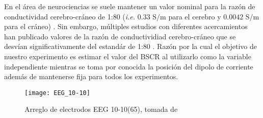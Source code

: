 En el área de neurociencias se suele mantener un valor nominal para la razón de conductividad cerebro-cráneo de 1:80 (\emph{i.e.} $0.33\text{ S/m}$ para el cerebro y $0.0042 \text{ S/m}$ para el cráneo) \cite{Rush1968,Rush1969,Cohen1983}. Sin embargo, múltiples estudios con diferentes acercamientos han publicado valores de la razón de conductividiad cerebro-cráneo que se desvían significativamente del estandár de 1:80 \cite{McCann2019}. Razón por la cual el objetivo de nuestro experimento es estimar el valor del BSCR al utilizarlo como la variable independiente mientras se toma por conocida la posición del dipolo de corriente además de mantenerse fija para todos los experimentos.

\begin{figure}[tb]
	\centering
	\texttt{[image: EEG\_10-10]}
	\caption{Arreglo de electrodos EEG 10-10(65), tomada de \cite{krolEnglishEEGElectrode2020}}
	\label{fig:EEG10-10}
\end{figure}

